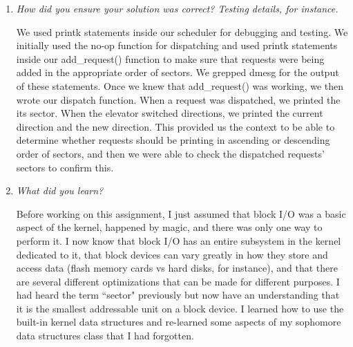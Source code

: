 \documentclass[letterpaper,10pt,titlepage]{article}
\newcommand{\tab}{\hspace*{2em}} %
\begin{document}
\begin{enumerate}
\item \emph{How did you ensure your solution was correct? Testing details, for instance.}

\tab We used printk statements inside our scheduler for debugging and testing. We initially used the no-op function for dispatching and used printk statements inside our add\_request() function to make sure that requests were being added in the appropriate order of sectors. We grepped dmesg for the output of these statements. Once we knew that add\_request() was working, we then wrote our dispatch function. When a request was dispatched, we printed the its sector. When the elevator switched directions, we printed the current direction and the new direction. This provided us the context to be able to determine whether requests should be printing in ascending or descending order of sectors, and then we were able to check the dispatched requests' sectors to confirm this.

\item \emph{What did you learn?}

\tab Before working on this assignment, I just assumed that block I/O was a basic aspect of the kernel, happened by magic, and there was only one way to perform it. I now know that block I/O has an entire subsystem in the kernel dedicated to it, that block devices can vary greatly in how they store and access data (flash memory cards vs hard disks, for instance), and that there are several different optimizations that can be made for different purposes. I had heard the term ``sector" previously but now have an understanding that it is the smallest addressable unit on a block device. I learned how to use the built-in kernel data structures and re-learned some aspects of my sophomore data structures class that I had forgotten.

\end{enumerate}

%
\end{document}

